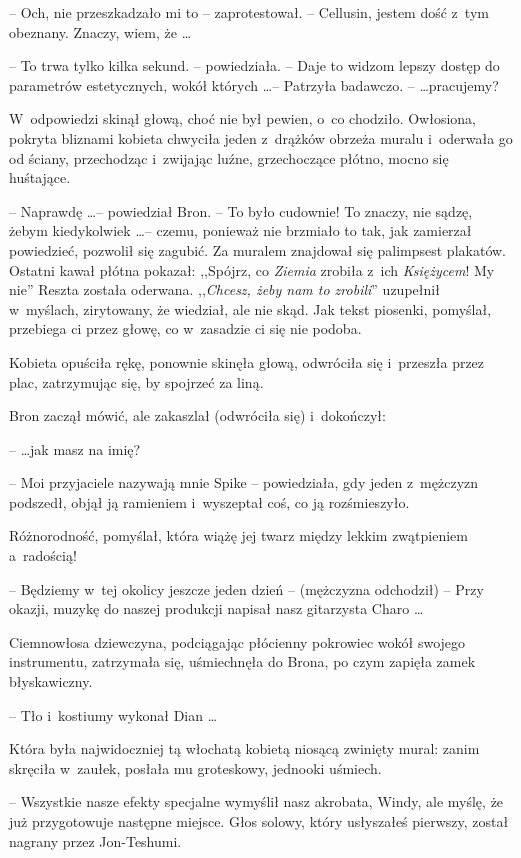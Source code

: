 \documentclass[oneside,polish,11pt,rmheadings]{mwbk}
\begin{document}
-- Och, nie przeszkadzało mi to -- zaprotestował. -- Cellusin, jestem dość z~tym obeznany. Znaczy, wiem, że \ldots  

-- To trwa tylko kilka sekund. -- powiedziała. -- Daje to widzom lepszy dostęp do parametrów estetycznych, wokół których  \ldots  -- Patrzyła badawczo. --  \ldots  pracujemy? 

W~odpowiedzi skinął głową, choć nie był pewien, o~co chodziło.  Owłosiona, pokryta bliznami kobieta chwyciła jeden z~drążków obrzeża muralu i~oderwała go od ściany, przechodząc i~zwijając luźne, grzechoczące płótno, mocno się huśtające. 

-- Naprawdę \ldots  -- powiedział Bron. -- To było cudownie! To znaczy, nie sądzę, żebym kiedykolwiek \ldots  -- czemu, ponieważ nie brzmiało to tak, jak zamierzał powiedzieć, pozwolił się zagubić. Za muralem znajdował się palimpsest plakatów. Ostatni kawał płótna pokazał: ,,Spójrz, co \textit{Ziemia } zrobiła z~ich \textit{Księżycem}!  My nie'' Reszta została oderwana. ,,\textit{Chcesz, żeby nam to zrobili}'' uzupełnił w~myślach, zirytowany, że wiedział, ale nie skąd. Jak tekst piosenki, pomyślał, przebiega ci przez głowę, co w~zasadzie ci się nie podoba. 

Kobieta opuściła rękę, ponownie skinęła głową, odwróciła się i~przeszła przez plac, zatrzymując się, by spojrzeć za liną. 

Bron zaczął mówić, ale zakaszlał (odwróciła się) i~dokończył:  

--  \ldots jak masz na imię?

-- Moi przyjaciele nazywają mnie Spike -- powiedziała, gdy jeden z~mężczyzn podszedł, objął ją ramieniem i~wyszeptał coś, co ją rozśmieszyło. 

Różnorodność, pomyślał, która wiążę jej twarz między lekkim zwątpieniem a~radością! 

-- Będziemy w~tej okolicy jeszcze jeden dzień -- (mężczyzna odchodził) -- Przy okazji, muzykę do naszej produkcji napisał nasz gitarzysta Charo \ldots  

Ciemnowłosa dziewczyna, podciągając płócienny pokrowiec wokół swojego instrumentu, zatrzymała się, uśmiechnęła do Brona, po czym zapięła zamek błyskawiczny. 

-- Tło i~kostiumy wykonał Dian \ldots  

Która była najwidoczniej tą włochatą kobietą niosącą zwinięty mural: zanim skręciła w~zaułek, posłała mu groteskowy, jednooki uśmiech. 

-- Wszystkie nasze efekty specjalne wymyślił nasz akrobata, Windy, ale myślę, że już przygotowuje następne miejsce. Głos solowy, który usłyszałeś pierwszy, został nagrany przez Jon-Teshumi. 
\end{document}
